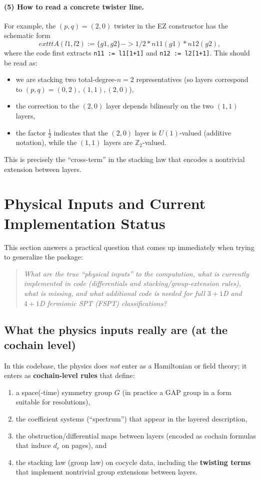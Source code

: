 \documentclass{SciPost}
\begin{document}
\paragraph{(5) How to read a concrete twister line.}
For example, the $(p,q)=(2,0)$ twister in the EZ constructor has the schematic form
\begin{equation}
	exttt{A(l1,l2) := \{g1,g2\} -> 1/2 * n11(g1) * n12(g2)},
\end{equation}
where the code first extracts \texttt{n11 := l1[1+1]} and \texttt{n12 := l2[1+1]}.
This should be read as:
\begin{itemize}
    \item we are stacking two total-degree-$n=2$ representatives (so layers correspond to $(p,q)=(0,2),(1,1),(2,0)$),
    \item the correction to the $(2,0)$ layer depends bilinearly on the two $(1,1)$ layers,
    \item the factor $\frac12$ indicates that the $(2,0)$ layer is $U(1)$-valued (additive notation), while the $(1,1)$ layers are $\mathbb{Z}_2$-valued.
\end{itemize}
This is precisely the ``cross-term'' in the stacking law that encodes a nontrivial extension between layers.

\section{Physical Inputs and Current Implementation Status}
\label{sec:physical-inputs-status}

This section answers a practical question that comes up immediately when trying to generalize the package:
\begin{quote}
\emph{What are the true ``physical inputs'' to the computation, what is currently implemented in code (differentials and stacking/group-extension rules), what is missing, and what additional code is needed for full $3{+}1$D and $4{+}1$D fermionic SPT (FSPT) classifications?}
\end{quote}

\subsection{What the physics inputs really are (at the cochain level)}

In this codebase, the physics does \emph{not} enter as a Hamiltonian or field theory; it enters as \textbf{cochain-level rules} that define:
\begin{enumerate}
    \item a space(-time) symmetry group $G$ (in practice a GAP group in a form suitable for resolutions),
    \item the coefficient systems (``spectrum'') that appear in the layered description,
    \item the obstruction/differential maps between layers (encoded as cochain formulas that induce $d_r$ on pages), and
    \item the stacking law (group law) on cocycle data, including the \textbf{twisting terms} that implement nontrivial group extensions between layers.
\end{enumerate}
\end{document}
